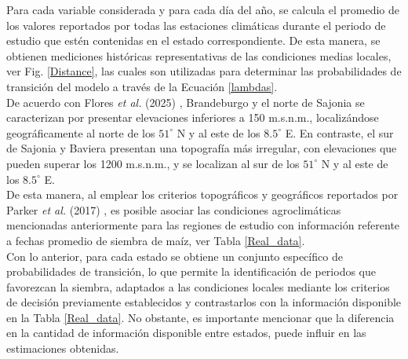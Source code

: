 Para cada variable considerada y para cada día del año, se calcula el promedio de los valores reportados por todas las estaciones climáticas durante el periodo de estudio que estén contenidas en el estado correspondiente. De esta manera, se obtienen mediciones históricas representativas de las condiciones medias locales, ver Fig. \ref{Distance}, las cuales son utilizadas para determinar las probabilidades de transición del modelo a través de la Ecuación \eqref{lambdas}.\\


De acuerdo con Flores \textit{et al.} (2025) \cite{Flores_2025}, Brandeburgo y el norte de Sajonia se caracterizan por presentar elevaciones inferiores a 150 m.s.n.m., localizándose geográficamente al norte de los $51^\circ$ N y al este de los $8.5^\circ$ E. En contraste, el sur de Sajonia y Baviera presentan una topografía más irregular, con elevaciones que pueden superar los 1200 m.s.n.m., y se localizan al sur de los $51^\circ$ N y al este de los $8.5^\circ$ E.\\



De esta manera, al emplear los criterios topográficos y geográficos reportados por Parker \textit{et al.} (2017) \cite[Tabla 1]{Parker_2016}, es posible asociar las condiciones agroclimáticas mencionadas anteriormente para las regiones de estudio con información referente a fechas promedio de siembra de maíz, ver Tabla \ref{Real_data}.\\



Con lo anterior, para cada estado se obtiene un conjunto específico de probabilidades de transición, lo que permite la identificación de periodos que favorezcan la siembra, adaptados a las condiciones locales mediante los criterios de decisión previamente establecidos y contrastarlos con la información disponible en la Tabla \ref{Real_data}. No obstante, es importante mencionar que la diferencia en la cantidad de información disponible entre estados, puede influir en las estimaciones obtenidas.